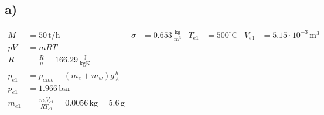 

\subsection*{a)}
\begin{align*}
M &= 50 \, \text{t/h} & \sigma &= 0.653 \, \frac{\text{kg}}{\text{m}^3} & T_{e1} &= 500^\circ \text{C} & V_{e1} &= 5.15 \cdot 10^{-3} \, \text{m}^3 \\
pV &= mRT \\
R &= \frac{R}{\mu} = 166.29 \, \frac{\text{J}}{\text{kgK}} \\
p_{e1} &= p_{amb} + (m_e + m_w) g \frac{h}{A} \\
p_{e1} &= 1.966 \, \text{bar} \\
m_{e1} &= \frac{m_i V_{e1}}{R T_{e1}} = 0.0056 \, \text{kg} = 5.6 \, \text{g}
\end{align*}